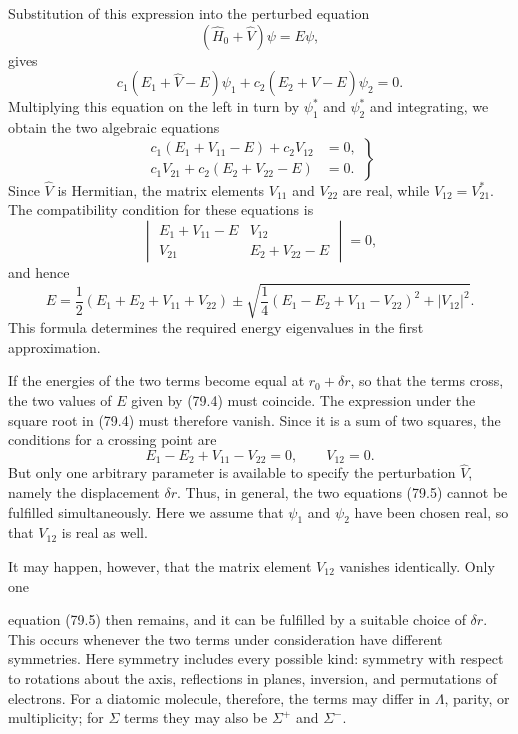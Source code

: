 Substitution of this expression into the perturbed equation
\begin{equation}
 (\widehat H_0+\widehat V)\psi=E\psi,
 \tag{79.2}
\end{equation}
gives
\[
 c_1(E_1+\widehat V-E)\psi_1+c_2(E_2+\widehat V-E)\psi_2=0.
\]
Multiplying this equation on the left in turn by $\psi_1^*$ and $\psi_2^*$ and integrating, we obtain the two algebraic equations
\begin{equation}
 \left.\begin{aligned}
 c_1(E_1+V_{11}-E)+c_2V_{12}&=0,\\
 c_1V_{21}+c_2(E_2+V_{22}-E)&=0.
 \end{aligned}\right\}
 \tag{79.3}
\end{equation}
Since $\widehat V$ is Hermitian, the matrix elements $V_{11}$ and $V_{22}$ are real, while $V_{12}=V_{21}^*$. The compatibility condition for these equations is
\[
 \begin{vmatrix}E_1+V_{11}-E&V_{12}\\V_{21}&E_2+V_{22}-E\end{vmatrix}=0,
\]
and hence
\begin{equation}
 E=\frac12(E_1+E_2+V_{11}+V_{22})\pm
 \sqrt{\frac14(E_1-E_2+V_{11}-V_{22})^2+|V_{12}|^2}.
 \tag{79.4}
\end{equation}
This formula determines the required energy eigenvalues in the first approximation.

If the energies of the two terms become equal at $r_0+\delta r$, so that the terms cross, the two values of $E$ given by (79.4) must coincide. The expression under the square root in (79.4) must therefore vanish. Since it is a sum of two squares, the conditions for a crossing point are
\begin{equation}
 E_1-E_2+V_{11}-V_{22}=0,\qquad V_{12}=0.
 \tag{79.5}
\end{equation}
But only one arbitrary parameter is available to specify the perturbation $\widehat V$, namely the displacement $\delta r$. Thus, in general, the two equations (79.5) cannot be fulfilled simultaneously. Here we assume that $\psi_1$ and $\psi_2$ have been chosen real, so that $V_{12}$ is real as well.

It may happen, however, that the matrix element $V_{12}$ vanishes identically. Only one

equation (79.5) then remains, and it can be fulfilled by a suitable choice of $\delta r$. This occurs whenever the two terms under consideration have different symmetries. Here symmetry includes every possible kind: symmetry with respect to rotations about the axis, reflections in planes, inversion, and permutations of electrons. For a diatomic molecule, therefore, the terms may differ in $\Lambda$, parity, or multiplicity; for $\Sigma$ terms they may also be $\Sigma^+$ and $\Sigma^-$.

